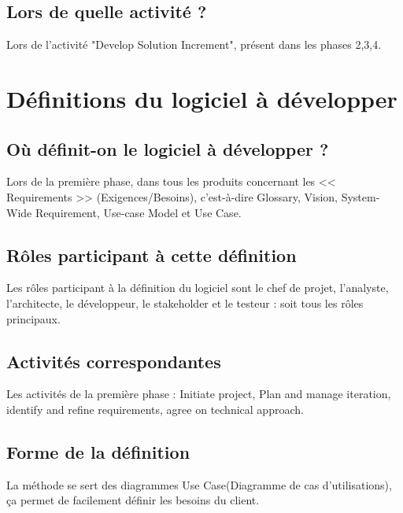\documentclass[a4paper, 11pt]{article}
\begin{document}
\subsection{Lors de quelle activité ?}
Lors de l'activité "Develop Solution Increment", présent dans les phases 2,3,4.

\section{Définitions du logiciel à développer}
\subsection{Où définit-on le logiciel à développer ?}
Lors de la première phase, dans tous les produits concernant les << Requirements >> (Exigences/Besoins), c'est-à-dire Glossary, Vision, System-Wide Requirement,
Use-case Model et Use Case.

\subsection{Rôles participant à cette définition} 
Les rôles participant à la définition du logiciel sont le chef de projet, l'analyste, l'architecte, le développeur, le stakeholder et le testeur : soit tous les
rôles principaux.

\subsection{Activités correspondantes}
Les activités de la première phase : Initiate project, Plan and manage iteration, identify and refine requirements, agree on technical approach.

\subsection{Forme de la définition}
La méthode se sert des diagrammes Use Case(Diagramme de cas d'utilisations), ça permet de facilement définir les besoins du client.
	
\end{document}
